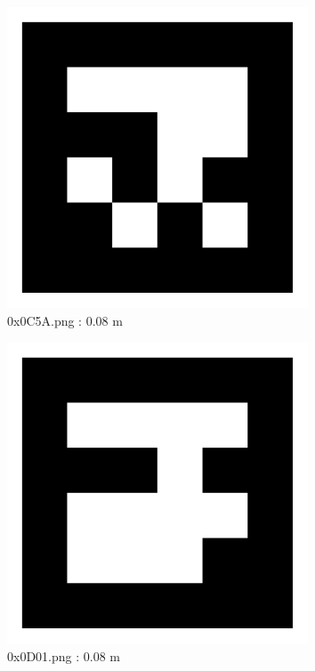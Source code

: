 \documentclass[11pt,a4,BCOR=0cm]{scrartcl}
\begin{document}
\begin{figure}
  \centering
    \includegraphics[width=8.955cm]{0x0C5A.pdf}
    \caption{0x0C5A.png : 0.08 m}
    \label{fig:0x0C5A.pdf}
  
\end{figure} 

\begin{figure}
  \centering
    \includegraphics[width=8.955cm]{0x0D01.pdf}
    \caption{0x0D01.png : 0.08 m}
    \label{fig:0x0D01.pdf}
  
\end{figure} 

\clearpage
\end{document}
